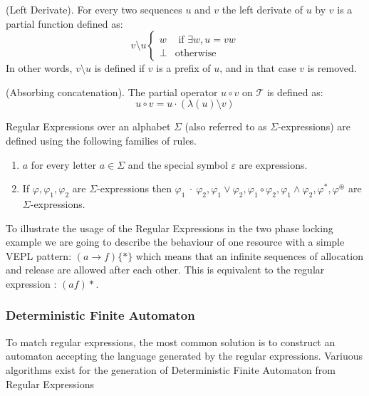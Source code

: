 			\begin{dfn}
				(Left Derivate).\citep{tre}
				For every two sequences $u$ and $v$ the left derivate of $u$ by $v$
				is a partial function defined as:
				\[ v \setminus u
					\begin{cases}
						w & \text{ if } \exists w,u = vw \\
						\perp & \text{otherwise}
					\end{cases}
				\]
				In other words, $v \setminus u$ is defined if $v$ is a prefix of $u$,
				and in that case $v$ is removed.
			\end{dfn}
			
			\begin{dfn}
				(Absorbing concatenation).
				The partial operator $u \circ v$ on $\mathcal{T}$ is defined as:
				\[ u \circ v = u \cdot (\lambda (u) \setminus v) \]
			\end{dfn}
			
			\begin{dfn}
				\label{dfn:cep:re}
				Regular Expressions over an alphabet $\Sigma$ (also referred to as $\Sigma$-expressions)
				are defined using the following families of rules.
				\begin{enumerate}
					\item \underline{$a$} for every letter $a \in \Sigma$ and the special symbol $\varepsilon$ are expressions.
					\item If $\varphi, \varphi_1, \varphi_2$ are $\Sigma$-expressions then %
						$ %
						\varphi_1~\cdot~\varphi_2,
						\varphi_1 \vee \varphi_2,
						\varphi_1 \circ \varphi_2,
						\varphi_1 \wedge \varphi_2,
						\varphi^\ast,
						\varphi^\circledast
						$ are $\Sigma$-expressions.
				\end{enumerate}
			\end{dfn}
			
			To illustrate the usage of the Regular Expressions in the two phase locking example we are going to describe the behaviour of one resource with a simple VEPL pattern:
			$(a \rightarrow f)\{\ast\}$ which means that an infinite sequences of allocation and release are allowed after each other. This is equivalent to the 
			regular expression : $(af)\ast$.

			\subsubsection{Deterministic Finite Automaton}
				To match regular expressions, the most common solution is to construct an automaton accepting the language generated by the regular expressions. Variuous algorithms
				exist for the generation of Deterministic Finite Automaton from Regular Expressions
				
